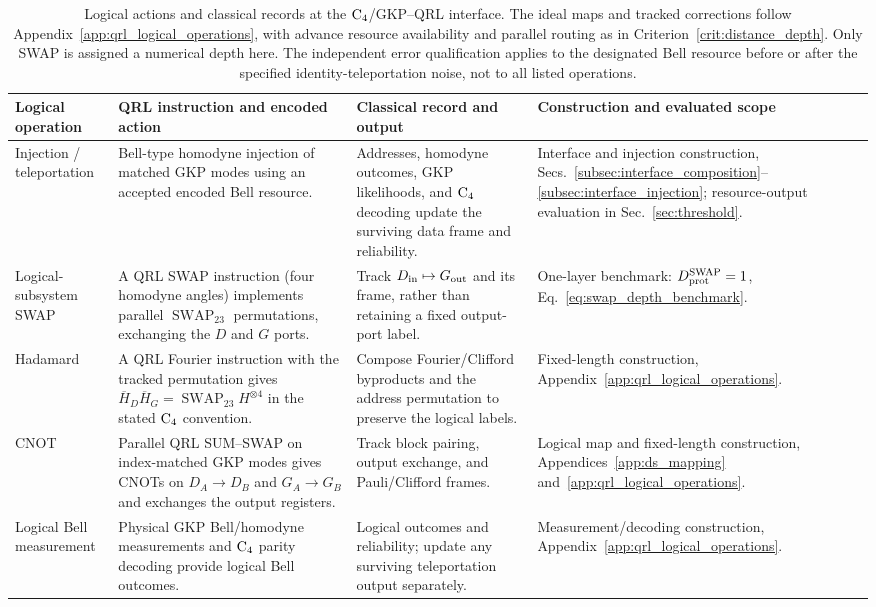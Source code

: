 \documentclass[aps,
prx,
superscriptaddress,
reprint,
longbibliography,
floatfix]{revtex4-2}
\begin{document}
\begin{table}[t]
\centering
\small
\renewcommand{\arraystretch}{1.13}
\setlength{\tabcolsep}{5pt}
\begin{tabular*}{\textwidth}{@{\extracolsep{\fill}}p{}p{}p{}p{}@{}}
\toprule
\raggedright\textbf{Logical operation} & \raggedright\textbf{QRL instruction and encoded action} & \raggedright\textbf{Classical record and output} & \raggedright\textbf{Construction and evaluated scope} \tabularnewline
\midrule
\raggedright Injection / teleportation &
\raggedright Bell-type homodyne injection of matched GKP modes using an accepted encoded Bell resource. &
\raggedright Addresses, homodyne outcomes, GKP likelihoods, and ${\rm C_4}$ decoding update the surviving data frame and reliability. &
\raggedright Interface and injection construction, Secs.~\ref{subsec:interface_composition}--\ref{subsec:interface_injection}; resource-output evaluation in Sec.~\ref{sec:threshold}. \tabularnewline
\addlinespace[5pt]
\raggedright Logical-subsystem SWAP &
\raggedright A QRL SWAP instruction (four homodyne angles) implements parallel $\operatorname{SWAP}_{23}$ permutations, exchanging the $D$ and $G$ ports. &
\raggedright Track $D_{\rm in}\mapsto G_{\rm out}$ and its frame, rather than retaining a fixed output-port label. &
\raggedright One-layer benchmark: $D_{\rm prot}^{\rm SWAP}=1$, Eq.~\eqref{eq:swap_depth_benchmark}. \tabularnewline
\addlinespace[5pt]
\raggedright Hadamard &
\raggedright A QRL Fourier instruction with the tracked permutation gives $\overline H_D\overline H_G=\operatorname{SWAP}_{23}H^{\otimes4}$ in the stated ${\rm C_4}$ convention. &
\raggedright Compose Fourier/Clifford byproducts and the address permutation to preserve the logical labels. &
\raggedright Fixed-length construction, Appendix~\ref{app:qrl_logical_operations}. \tabularnewline
\addlinespace[5pt]
\raggedright CNOT &
\raggedright Parallel QRL SUM--SWAP on index-matched GKP modes gives CNOTs on $D_A\to D_B$ and $G_A\to G_B$ and exchanges the output registers. &
\raggedright Track block pairing, output exchange, and Pauli/Clifford frames. &
\raggedright Logical map and fixed-length construction, Appendices~\ref{app:ds_mapping} and~\ref{app:qrl_logical_operations}. \tabularnewline
\addlinespace[5pt]
\raggedright Logical Bell measurement &
\raggedright Physical GKP Bell/homodyne measurements and ${\rm C_4}$ parity decoding provide logical Bell outcomes. &
\raggedright Logical outcomes and reliability; update any surviving teleportation output separately. &
\raggedright Measurement/decoding construction, Appendix~\ref{app:qrl_logical_operations}. \tabularnewline
\bottomrule
\end{tabular*}
\caption{Logical actions and classical records at the ${\rm C_4}$/GKP--QRL interface. The ideal maps and tracked corrections follow Appendix~\ref{app:qrl_logical_operations}, with advance resource availability and parallel routing as in Criterion~\ref{crit:distance_depth}. Only SWAP is assigned a numerical depth here. The independent error qualification applies to the designated Bell resource before or after the specified identity-teleportation noise, not to all listed operations.}
\label{tab:operation_evidence}
\end{table}
\end{document}
